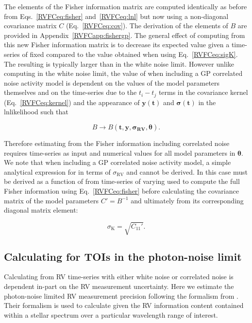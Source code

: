 The elements of the Fisher information matrix are computed identically as before from Eqs.~\ref{RVFCeq:fisher}
and~\ref{RVFCeq:lnl} but now using a non-diagonal covariance matrix $C$ (Eq.~\ref{RVFCeq:cov}). The derivation
of the elements of $B$ are provided in Appendix~\ref{RVFCapp:fishergp}. The general effect of computing \sigK{}
from this new Fisher information matrix is to decrease its expected value given a time-series of fixed
\nrv{} compared to the value obtained when using
Eq.~\ref{RVFCeq:sigK}. The resulting \nrv{} is typically larger than in the white noise limit.
However unlike computing \sigK{} in the white noise limit, the value of \sigK{} when including a
GP correlated noise activity model is dependent on the values of the model parameters themselves
and on the time-series due to the $t_i-t_j$ terms in the covariance kernel (Eq.~\ref{RVFCeq:kernel})
and the appearance of $\mathbf{y}(\mathbf{t})$ and
$\boldsymbol{\sigma}(\mathbf{t})$ in the lnlikelihood such that

\begin{equation}
  B \to B(\mathbf{t}, \mathbf{y}, \boldsymbol{\sigma_{\text{RV}}}, \boldsymbol{\theta}).
\end{equation}

\noindent Therefore estimating \sigK{} from the Fisher
information including correlated noise requires time-series as input and numerical values for all model
parameters in $\boldsymbol{\theta}$. \\

We note that when including a GP correlated noise activity model, a simple analytical expression
for \sigK{} in terms of $\sigma_{\text{RV}}$ and \nrv{} cannot be derived. In this case \sigK{} must be
derived as a function of \nrv{}
from time-series of varying \nrv{} used to compute the full Fisher
information using Eq.~\ref{RVFCeq:fisher} before calculating the covariance matrix of the model parameters
$C'=B^{-1}$ and ultimately \sigK{} from its corresponding diagonal matrix element:

\begin{equation}
  \sigma_{\text{K}} = \sqrt{C_{11}'}.
  \label{RVFCeq:sigKGP}
\end{equation}

\subsection{Calculating \sigRV{} for TOIs in the photon-noise limit} \label{RVFCsect:sigrv}
Calculating \sigK{} from RV time-series with either white noise or correlated noise is dependent
in-part on the RV measurement uncertainty. Here we estimate the photon-noise limited
RV measurement precision \sigRV{} following the formalism from \cite{bouchy01}. Their formalism
is used to calculate \sigRV{} given the RV information content contained within a stellar spectrum
over a particular wavelength range of interest. \\

